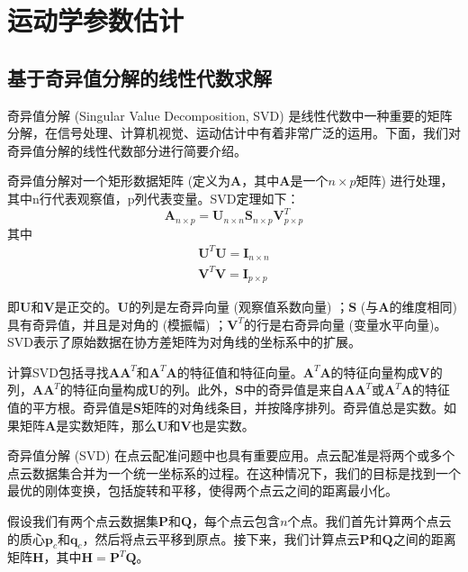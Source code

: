 \section{运动学参数估计}
\subsection{基于奇异值分解的线性代数求解}
奇异值分解\cite{levinson2020analysis} (Singular Value Decomposition, SVD) 是线性代数中一种重要的矩阵分解，在信号处理、计算机视觉、运动估计中有着非常广泛的运用。下面，我们对奇异值分解的线性代数部分进行简要介绍。

奇异值分解对一个矩形数据矩阵 (定义为$\boldsymbol{A}$，其中$\boldsymbol{A}$是一个$n \times p$矩阵) 进行处理，其中n行代表观察值，p列代表变量。SVD定理如下：
\begin{equation}
\boldsymbol{A}_{n \times p} = \boldsymbol{U}_{n \times n} \boldsymbol{S}_{n \times p} \boldsymbol{V}^T_{p \times p}
\end{equation}
其中
\begin{align}
    \boldsymbol{U}^T \boldsymbol{U} = \boldsymbol{I}_{n \times n} \\
    \boldsymbol{V}^T \boldsymbol{V} = \boldsymbol{I}_{p \times p}
\end{align}

即$\boldsymbol{U}$和$\boldsymbol{V}$是正交的。$\boldsymbol{U}$的列是左奇异向量 (观察值系数向量) ；$\boldsymbol{S}$ (与$\boldsymbol{A}$的维度相同) 具有奇异值，并且是对角的 (模振幅) ；$\boldsymbol{V}^T$的行是右奇异向量 (变量水平向量)。SVD表示了原始数据在协方差矩阵为对角线的坐标系中的扩展。

计算SVD包括寻找$\boldsymbol{A} \boldsymbol{A}^T$和$\boldsymbol{A}^T \boldsymbol{A}$的特征值和特征向量。$\boldsymbol{A}^T \boldsymbol{A}$的特征向量构成$\boldsymbol{V}$的列，$\boldsymbol{A} \boldsymbol{A}^T$的特征向量构成$\boldsymbol{U}$的列。此外，$\boldsymbol{S}$中的奇异值是来自$\boldsymbol{A} \boldsymbol{A}^T$或$\boldsymbol{A}^T \boldsymbol{A}$的特征值的平方根。奇异值是$\boldsymbol{S}$矩阵的对角线条目，并按降序排列。奇异值总是实数。如果矩阵$\boldsymbol{A}$是实数矩阵，那么$\boldsymbol{U}$和$\boldsymbol{V}$也是实数。

奇异值分解 (SVD) 在点云配准问题中也具有重要应用。点云配准是将两个或多个点云数据集合并为一个统一坐标系的过程。在这种情况下，我们的目标是找到一个最优的刚体变换，包括旋转和平移，使得两个点云之间的距离最小化。

假设我们有两个点云数据集$\boldsymbol{P}$和$\boldsymbol{Q}$，每个点云包含$n$个点。我们首先计算两个点云的质心$\boldsymbol{p}_c$和$\boldsymbol{q}_c$，然后将点云平移到原点。接下来，我们计算点云$\boldsymbol{P}$和$\boldsymbol{Q}$之间的距离矩阵$\boldsymbol{H}$，其中$\boldsymbol{H}=\boldsymbol{P}^T\boldsymbol{Q}$。

